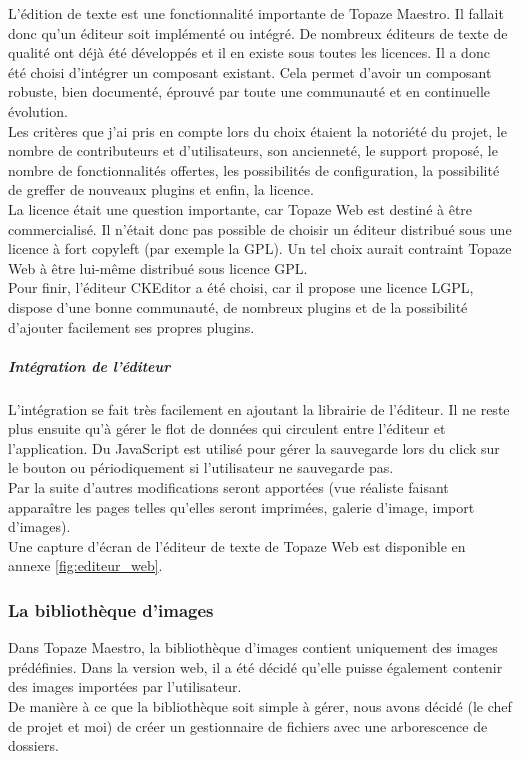 L’édition de texte est une fonctionnalité importante de Topaze Maestro. Il fallait donc qu’un éditeur soit implémenté ou intégré. De nombreux éditeurs de texte de qualité ont déjà été développés et il en existe sous toutes les licences. Il a donc été choisi d’intégrer un composant existant. Cela permet d’avoir un composant robuste, bien documenté, éprouvé par toute une communauté et en continuelle évolution.\\

Les critères que j’ai pris en compte lors du choix étaient la notoriété du projet, le nombre de contributeurs et d’utilisateurs, son ancienneté, le support proposé, le nombre de fonctionnalités offertes, les possibilités de configuration, la possibilité de greffer de nouveaux plugins et enfin, la licence.\\

La licence était une question importante, car Topaze Web est destiné à être commercialisé. Il n’était donc pas possible de choisir un éditeur distribué sous une licence à fort copyleft (par exemple la GPL). Un tel choix aurait contraint Topaze Web à être lui-même distribué sous licence GPL.\\

Pour finir, l’éditeur CKEditor a été choisi, car il propose une licence LGPL, dispose d’une bonne communauté, de nombreux plugins et de la possibilité d’ajouter facilement ses propres plugins.

\subparagraph*{Intégration de l’éditeur\\}
L’intégration se fait très facilement en ajoutant la librairie de l’éditeur. Il ne reste plus ensuite qu’à gérer le flot de données qui circulent entre l’éditeur et l’application. Du JavaScript est utilisé pour gérer la sauvegarde lors du click sur le bouton ou périodiquement si l’utilisateur ne sauvegarde pas.\\

Par la suite d’autres modifications seront apportées (vue réaliste faisant apparaître les pages telles qu’elles seront imprimées, galerie d’image, import d’images).\\

Une capture d'écran de l'éditeur de texte de Topaze Web est disponible en annexe \ref{fig:editeur_web}.

\subsubsection{La bibliothèque d'images}
Dans Topaze Maestro, la bibliothèque d'images contient uniquement des images prédéfinies. Dans la version web, il a été décidé qu'elle puisse également contenir des images importées par l'utilisateur.\\
De manière à ce que la bibliothèque soit simple à gérer, nous avons décidé (le chef de projet et moi) de créer un gestionnaire de fichiers avec une arborescence de dossiers.

